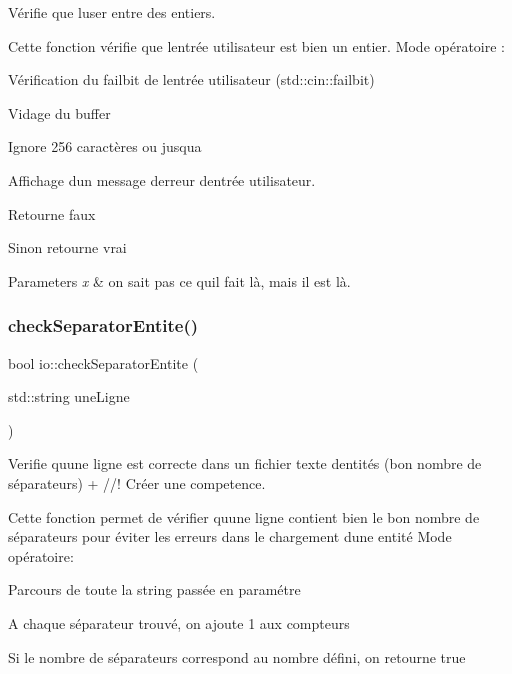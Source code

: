 Vérifie que l\textquotesingle{}user entre des entiers. 

Cette fonction vérifie que l\textquotesingle{}entrée utilisateur est bien un entier. Mode opératoire \+:
\begin{DoxyItemize}
\item Vérification du failbit de l\textquotesingle{}entrée utilisateur (std\+::cin\+::failbit)
\begin{DoxyEnumerate}
\item Vidage du buffer
\item Ignore 256 caractères ou jusqu\textquotesingle{}a {\ttfamily ~\newline
}
\item Affichage d\textquotesingle{}un message d\textquotesingle{}erreur d\textquotesingle{}entrée utilisateur.
\item Retourne faux
\end{DoxyEnumerate}
\item Sinon retourne vrai
\end{DoxyItemize}


\begin{DoxyParams}{Parameters}
{\em x} & on sait pas ce qu\textquotesingle{}il fait là, mais il est là. \\
\hline
\end{DoxyParams}
\mbox{\label{namespaceio_a993e82931eec7bf1db5110871c03c2d1}} 
\subsubsection{\texorpdfstring{check\+Separator\+Entite()}{checkSeparatorEntite()}}
{\footnotesize\ttfamily bool io\+::check\+Separator\+Entite (\begin{DoxyParamCaption}\item[{std\+::string}]{une\+Ligne }\end{DoxyParamCaption})}



Verifie qu\textquotesingle{}une ligne est correcte dans un fichier texte d\textquotesingle{}entités (bon nombre de séparateurs) + //! Créer une competence. 

Cette fonction permet de vérifier qu\textquotesingle{}une ligne contient bien le bon nombre de séparateurs pour éviter les erreurs dans le chargement d\textquotesingle{}une entité Mode opératoire\+:
\begin{DoxyItemize}
\item Parcours de toute la string passée en paramétre
\item A chaque séparateur trouvé, on ajoute 1 aux compteurs
\item Si le nombre de séparateurs correspond au nombre défini, on retourne true
\end{DoxyItemize}


